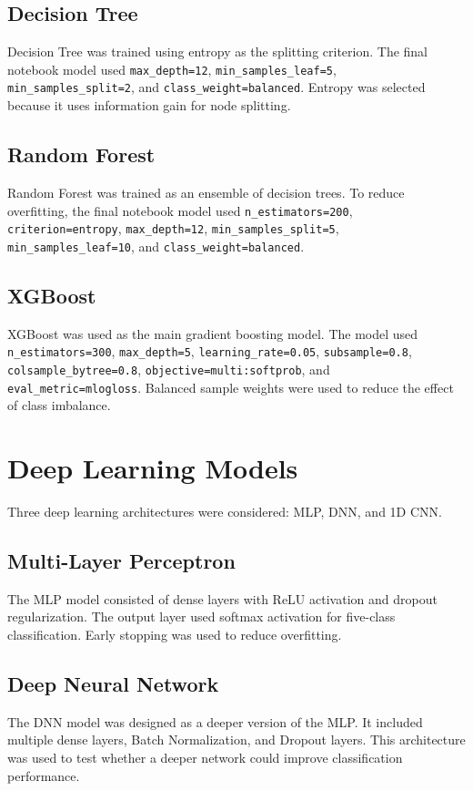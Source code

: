 \documentclass[conference]{IEEEtran}
\begin{document}
\subsection{Decision Tree}
Decision Tree was trained using entropy as the splitting criterion. The final notebook model used \texttt{max\_depth=12}, \texttt{min\_samples\_leaf=5}, \texttt{min\_samples\_split=2}, and \texttt{class\_weight=balanced}. Entropy was selected because it uses information gain for node splitting.

\subsection{Random Forest}
Random Forest was trained as an ensemble of decision trees. To reduce overfitting, the final notebook model used \texttt{n\_estimators=200}, \texttt{criterion=entropy}, \texttt{max\_depth=12}, \texttt{min\_samples\_split=5}, \texttt{min\_samples\_leaf=10}, and \texttt{class\_weight=balanced}.

\subsection{XGBoost}
XGBoost was used as the main gradient boosting model. The model used \texttt{n\_estimators=300}, \texttt{max\_depth=5}, \texttt{learning\_rate=0.05}, \texttt{subsample=0.8}, \texttt{colsample\_bytree=0.8}, \texttt{objective=multi:softprob}, and \texttt{eval\_metric=mlogloss}. Balanced sample weights were used to reduce the effect of class imbalance.

\section{Deep Learning Models}
Three deep learning architectures were considered: MLP, DNN, and 1D CNN.

\subsection{Multi-Layer Perceptron}
The MLP model consisted of dense layers with ReLU activation and dropout regularization. The output layer used softmax activation for five-class classification. Early stopping was used to reduce overfitting.

\subsection{Deep Neural Network}
The DNN model was designed as a deeper version of the MLP. It included multiple dense layers, Batch Normalization, and Dropout layers. This architecture was used to test whether a deeper network could improve classification performance.
\end{document}
